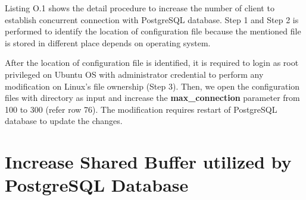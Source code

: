 Listing O.1 shows the detail procedure to increase the number of client to establish concurrent connection with PostgreSQL database. Step 1 and Step 2 is performed to identify the location of configuration file because the mentioned file is stored in different place depends on operating system. 

After the location of configuration file is identified, it is required to login as root privileged on Ubuntu OS with administrator credential to perform any modification on Linux's file ownership (Step 3). Then, we open the configuration files with directory as input and increase the \textbf{max\_connection} parameter from 100 to 300 (refer row 76). The modification requires restart of PostgreSQL database to update the changes. 

\newpage

\section{Increase Shared Buffer utilized by PostgreSQL Database}

